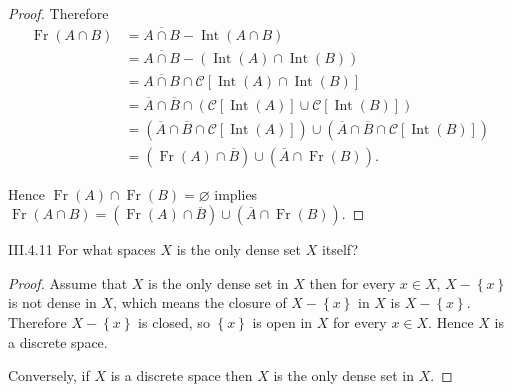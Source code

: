 \begin{proof}
    Therefore
    \begingroup
    \allowdisplaybreaks%
    \begin{align*}
        \operatorname{Fr}(A \cap B) & = \overline{A \cap B} - \operatorname{Int}(A \cap B)                                                                                                                                                         \\
                                    & = \overline{A \cap B} - (\operatorname{Int}(A) \cap \operatorname{Int}(B))                                                                                                                                   \\
                                    & = \overline{A \cap B} \cap \mathscr{C}\left[ \operatorname{Int}(A) \cap \operatorname{Int}(B) \right]                                                                                                        \\
                                    & = \overline{A} \cap \overline{B} \cap \left( \mathscr{C}\left[ \operatorname{Int}(A) \right] \cup \mathscr{C}\left[ \operatorname{Int}(B) \right] \right)                                                    \\
                                    & = \left( \overline{A} \cap \overline{B} \cap \mathscr{C}\left[ \operatorname{Int}(A) \right] \right) \cup \left( \overline{A} \cap \overline{B} \cap \mathscr{C}\left[ \operatorname{Int}(B) \right] \right) \\
                                    & = \left( \operatorname{Fr}(A) \cap \overline{B} \right) \cup \left( \overline{A} \cap \operatorname{Fr}(B) \right).
    \end{align*}
    \endgroup

    Hence \( \operatorname{Fr}(A) \cap \operatorname{Fr}(B) = \varnothing \) implies \( \operatorname{Fr}(A \cap B) = \left( \operatorname{Fr}(A) \cap \overline{B} \right) \cup \left( \overline{A} \cap \operatorname{Fr}(B) \right) \).
\end{proof}

\begin{problem}{III.4.11}
For what spaces \(X\) is the only dense set \(X\) itself?
\end{problem}

\begin{proof}
    Assume that \(X\) is the only dense set in \(X\) then for every \( x \in X \), \( X - \left\{ x \right\} \) is not dense in \( X \), which means the closure of \( X - \left\{ x \right\} \) in \(X\) is \( X - \left\{x\right\} \). Therefore \( X - \left\{x\right\} \) is closed, so \( \left\{ x \right\} \) is open in \(X\) for every \(x\in X\). Hence \(X\) is a discrete space.

    Conversely, if \(X\) is a discrete space then \(X\) is the only dense set in \(X\).
\end{proof}

